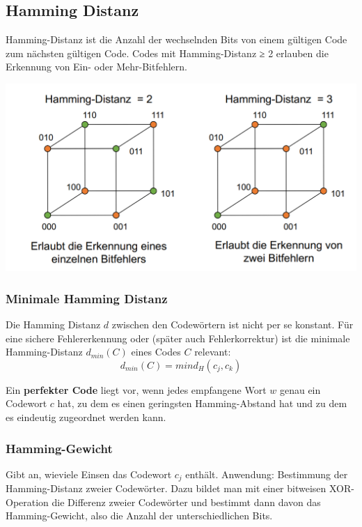 \subsection{Hamming Distanz}%
\label{sub:hamming_distanz}

Hamming-Distanz ist die Anzahl der wechselnden Bits von einem gültigen Code zum nächsten gültigen Code. Codes mit Hamming-Distanz ≥ 2 erlauben die Erkennung von
Ein- oder Mehr-Bitfehlern.

\begin{center}
    \includegraphics[width=1\linewidth]{images/hammingdist.png}
\end{center}

\subsubsection{Minimale Hamming Distanz}%
\label{ssub:minimale_hamming_distanz}

Die Hamming Distanz $d$ zwischen den Codewörtern ist nicht per se konstant.
Für eine sichere Fehlererkennung oder (später auch Fehlerkorrektur) ist
die minimale Hamming-Distanz $d_{min}(C)$ eines Codes $C$ relevant:
\[
    d_{min}(C)=min d_H (c_j, c_k)
\]

Ein \textbf{perfekter Code} liegt vor, wenn jedes empfangene Wort $w$ genau ein Codewort $c$ hat, zu dem es einen geringsten Hamming-Abstand hat und zu dem es eindeutig zugeordnet werden kann.

\subsubsection{Hamming-Gewicht}%
\label{ssub:hamming_gewicht}

Gibt an, wieviele Einsen das Codewort $c_j$ enthält. Anwendung: Bestimmung der Hamming-Distanz zweier Codewörter.
Dazu bildet man mit einer bitweisen XOR-Operation die Differenz zweier
Codewörter und bestimmt dann davon das Hamming-Gewicht, also die Anzahl
der unterschiedlichen Bits.

